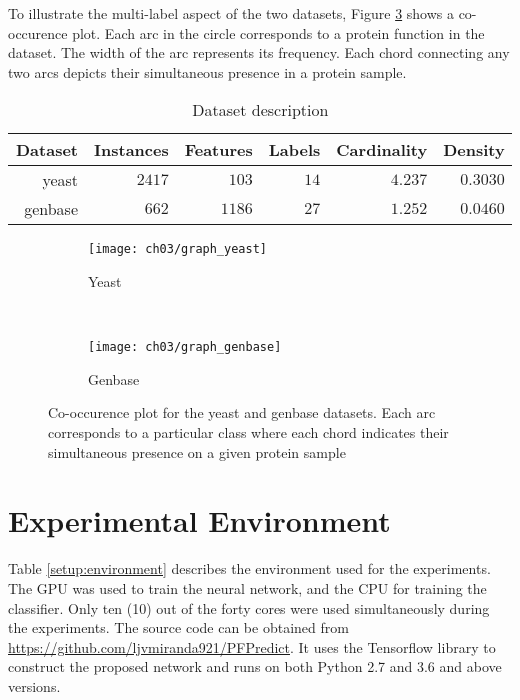 \par To illustrate the multi-label aspect of the two datasets, Figure
\ref{graph:cooccurence} shows a co-occurence plot. Each arc in the circle
corresponds to a protein function in the dataset. The width of the arc
represents its frequency. Each chord connecting any two arcs depicts their
simultaneous presence in a protein sample.


\begin{table}[t]
    \centering
    \caption{Dataset description}
    \label{setup:datasets}
    \begin{tabular}{@{}rrrrrr@{}}
        \toprule
        Dataset & Instances & Features & Labels & Cardinality & Density    \\ \midrule
        yeast   & $2417$      & $103$      & $14$     & $4.237$       & $0.3030$     \\
        genbase & $662$       & $1186$     & $27$     & $1.252$       & $0.0460$     \\ \bottomrule
    \end{tabular}
\end{table}


\begin{figure}[t]
    \centering
    \begin{subfigure}[b]{0.49\textwidth}
        \texttt{[image: ch03/graph\_yeast]}
        \caption{Yeast}
        \label{graph:yeast}
    \end{subfigure}
    ~ %
    \begin{subfigure}[b]{0.49\textwidth}
        \texttt{[image: ch03/graph\_genbase]}
        \caption{Genbase}
        \label{graph:genbase}
    \end{subfigure}
    \caption[Co-occurence plot for the yeast and genbase datasets]
    {Co-occurence plot for the yeast and genbase datasets. Each arc corresponds
    to a particular class where each chord indicates their simultaneous
    presence on a given protein sample}
    \label{graph:cooccurence}
\end{figure}

\section{Experimental Environment}
\label{ExperimentalEnvironment}

Table \ref{setup:environment} describes the environment used for the
experiments. The GPU was used to train the neural network, and the CPU for
training the classifier. Only ten (10) out of the forty cores were used
simultaneously during the experiments. The source code can be obtained from
\url{https://github.com/ljvmiranda921/PFPredict}. It uses the Tensorflow
library to construct the proposed network and runs on both Python 2.7 and 3.6
and above versions.

